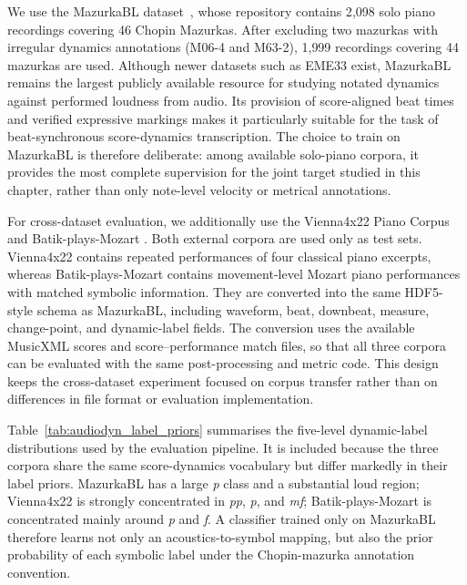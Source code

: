 We use the MazurkaBL dataset~\cite{kosta2018mazurkabl}, whose repository contains 2{,}098 solo piano recordings covering 46 Chopin Mazurkas. After excluding two mazurkas with irregular dynamics annotations (M06-4 and M63-2), 1{,}999 recordings covering 44 mazurkas are used. Although newer datasets such as EME33 \cite{hung2024eme33} exist, MazurkaBL remains the largest publicly available resource for studying notated dynamics against performed loudness from audio. Its provision of score-aligned beat times and verified expressive markings makes it particularly suitable for the task of beat-synchronous score-dynamics transcription. The choice to train on MazurkaBL is therefore deliberate: among available solo-piano corpora, it provides the most complete supervision for the joint target studied in this chapter, rather than only note-level velocity or metrical annotations.

For cross-dataset evaluation, we additionally use the Vienna4x22 Piano Corpus \cite{goebl1999vienna4x22} and Batik-plays-Mozart \cite{hu2023batik}. Both external corpora are used only as test sets. Vienna4x22 contains repeated performances of four classical piano excerpts, whereas Batik-plays-Mozart contains movement-level Mozart piano performances with matched symbolic information. They are converted into the same HDF5-style schema as MazurkaBL, including waveform, beat, downbeat, measure, change-point, and dynamic-label fields. The conversion uses the available MusicXML scores and score--performance match files, so that all three corpora can be evaluated with the same post-processing and metric code. This design keeps the cross-dataset experiment focused on corpus transfer rather than on differences in file format or evaluation implementation.

Table~\ref{tab:audiodyn_label_priors} summarises the five-level dynamic-label distributions used by the evaluation pipeline. It is included because the three corpora share the same score-dynamics vocabulary but differ markedly in their label priors. MazurkaBL has a large \textit{p} class and a substantial loud region; Vienna4x22 is strongly concentrated in \textit{pp}, \textit{p}, and \textit{mf}; Batik-plays-Mozart is concentrated mainly around \textit{p} and \textit{f}. A classifier trained only on MazurkaBL therefore learns not only an acoustics-to-symbol mapping, but also the prior probability of each symbolic label under the Chopin-mazurka annotation convention.

